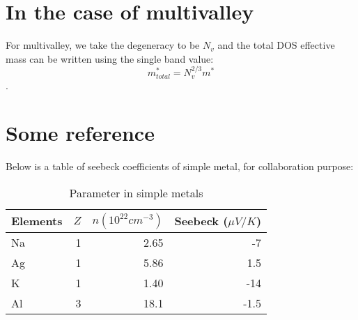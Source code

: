 \documentclass{article}
\begin{document}
\section{In the case of multivalley}
For multivalley, we take the degeneracy to be $N_v$ and the 
total DOS effective mass can be written using the single 
band value:
\begin{equation}
    m^*_{total} = N_v^{2/3}m^*
\end{equation}.

\section{Some reference}
Below is a table of seebeck coefficients of simple metal, for collaboration purpose:
\begin{table}[h]
    \caption{Parameter in simple metals}
    \centering
    \begin{tabular}{lrrr}
        \hline
        Elements & $Z$ & $n(10^{22} cm^{-3})$ & Seebeck ($\mu V/K$) \\ \hline
        Na       &  1  & 2.65                 & -7   \\
        Ag       &  1  & 5.86                 & 1.5  \\
        K        &  1  & 1.40                 & -14  \\
        Al       &  3  & 18.1                 & -1.5 \\ \hline
    \end{tabular}
\end{table}
\end{document}
